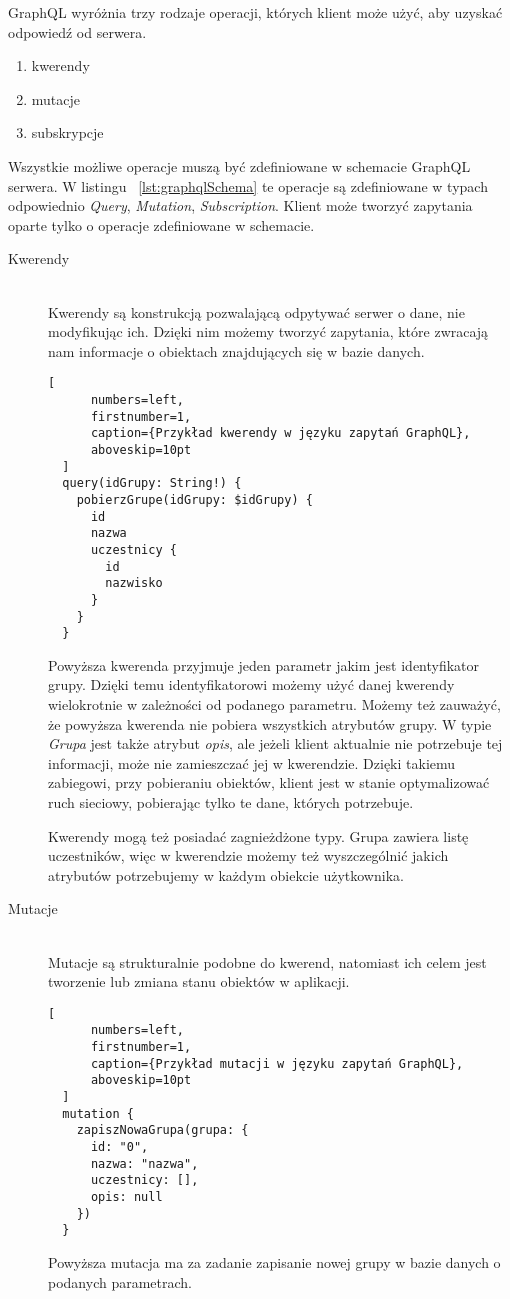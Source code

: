 GraphQL wyróżnia trzy rodzaje operacji, których klient może użyć, aby uzyskać odpowiedź od serwera.
\begin{enumerate}
  \item kwerendy 
  \item mutacje
  \item subskrypcje
\end{enumerate}
Wszystkie możliwe operacje muszą być zdefiniowane w schemacie GraphQL serwera. W listingu ~\ref{lst:graphqlSchema} te operacje są zdefiniowane w typach odpowiednio \emph{Query}, \emph{Mutation}, \emph{Subscription}. Klient może tworzyć zapytania oparte tylko o operacje zdefiniowane w schemacie.

\begin{description}
  \item[Kwerendy] \hfill \\ Kwerendy są konstrukcją pozwalającą odpytywać serwer o dane, nie modyfikując ich. Dzięki nim możemy tworzyć zapytania, które zwracają nam informacje o obiektach znajdujących się w bazie danych.
  \begin{addmargin}[6mm]{0mm}
  \begin{lstlisting}[
      numbers=left,
      firstnumber=1,
      caption={Przykład kwerendy w języku zapytań GraphQL},
      aboveskip=10pt
  ]
  query(idGrupy: String!) {
    pobierzGrupe(idGrupy: $idGrupy) {
      id
      nazwa
      uczestnicy {
        id
        nazwisko
      }
    }
  }
  \end{lstlisting}
  \end{addmargin}

  Powyższa kwerenda przyjmuje jeden parametr jakim jest identyfikator grupy. Dzięki temu identyfikatorowi możemy użyć danej kwerendy wielokrotnie w zależności od podanego parametru. Możemy też zauważyć, że powyższa kwerenda nie pobiera wszystkich atrybutów grupy. W typie \emph{Grupa} jest także atrybut \emph{opis}, ale jeżeli klient aktualnie nie potrzebuje tej informacji, może nie zamieszczać jej w kwerendzie. Dzięki takiemu zabiegowi, przy pobieraniu obiektów, klient jest w stanie optymalizować ruch sieciowy, pobierając tylko te dane, których potrzebuje. 

  Kwerendy mogą też posiadać zagnieżdżone typy. Grupa zawiera listę uczestników, więc w kwerendzie możemy też wyszczególnić jakich atrybutów potrzebujemy w każdym obiekcie użytkownika.
  \newline
  \item[Mutacje] \hfill \\ Mutacje są strukturalnie podobne do kwerend, natomiast ich celem jest tworzenie lub zmiana stanu obiektów w aplikacji.
  \begin{addmargin}[6mm]{0mm}
  \begin{lstlisting}[
      numbers=left,
      firstnumber=1,
      caption={Przykład mutacji w języku zapytań GraphQL},
      aboveskip=10pt
  ]
  mutation {
    zapiszNowaGrupa(grupa: {
      id: "0",
      nazwa: "nazwa",
      uczestnicy: [],
      opis: null 
    })
  }
  \end{lstlisting}
  \end{addmargin}
  Powyższa mutacja ma za zadanie zapisanie nowej grupy w bazie danych o podanych parametrach.


\end{description}
